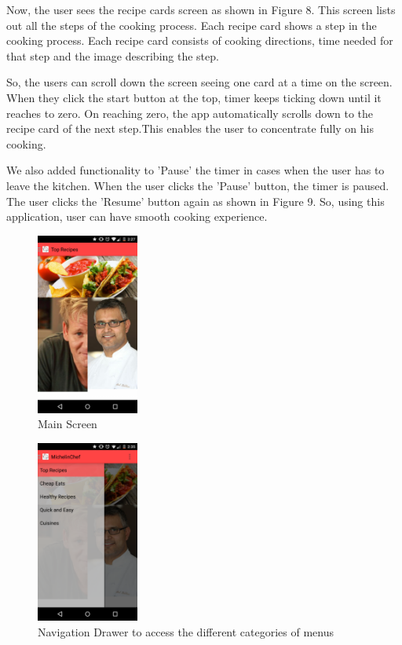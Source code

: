 Now, the user sees the recipe cards screen as shown in Figure 8. This screen lists out all the steps of the cooking process. Each recipe card shows a step in the cooking process. Each recipe card consists of cooking directions, time needed for that step and the image describing the step. 

So, the users can scroll down the screen seeing one card at a time on the screen. When they click the start button at the top, timer keeps ticking down until it reaches to zero. On reaching zero, the app automatically scrolls down to the recipe card of the next step.This enables the user to concentrate fully on his cooking.

We also added functionality to 'Pause' the timer in cases when the user has to leave the kitchen. When the user clicks the 'Pause' button, the timer is paused. The user clicks the 'Resume' button again as shown in Figure 9. So, using this application, user can have smooth cooking experience.

\begin{figure}[ht!]
	\centering
	\includegraphics[width=0.3\textwidth, height=0.3\textheight]{images/main_screen.png}
	\caption{Main Screen \label{overflow}}
\end{figure}
	
\begin{figure}[ht!]
	\centering
	\includegraphics[width=0.3\textwidth, height=0.3\textheight]{images/nav_draw.png}
	\caption{Navigation Drawer to access the different categories of menus\label{fig_1}}
\end{figure}

